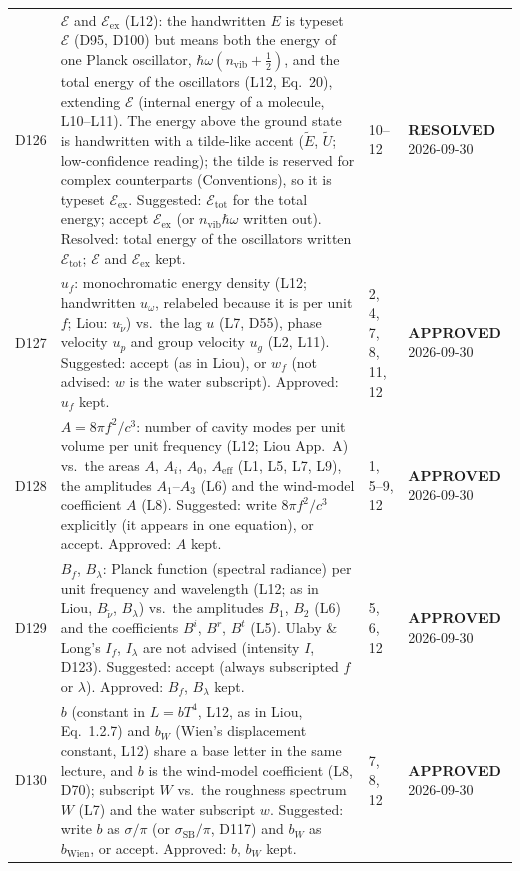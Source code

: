 \documentclass[11pt, oneside]{article}
\newcommand{\approved}{\textbf{APPROVED}}
\newcommand{\resolved}{\textbf{RESOLVED}}
\begin{document}
\begin{longtable}{l >{\raggedright\arraybackslash}p{} l l}
D126 & $\mathcal{E}$ and $\mathcal{E}_\mathrm{ex}$ (L12): the handwritten $E$ is typeset $\mathcal{E}$ (D95, D100) but means both the energy of one Planck oscillator, $\hbar\omega(n_\mathrm{vib} + \frac12)$, and the total energy of the oscillators (L12, Eq.~20), extending $\mathcal{E}$ (internal energy of a molecule, L10--L11). The energy above the ground state is handwritten with a tilde-like accent ($\tilde{E}$, $\tilde{U}$; low-confidence reading); the tilde is reserved for complex counterparts (Conventions), so it is typeset $\mathcal{E}_\mathrm{ex}$. Suggested: $\mathcal{E}_\mathrm{tot}$ for the total energy; accept $\mathcal{E}_\mathrm{ex}$ (or $n_\mathrm{vib}\hbar\omega$ written out). Resolved: total energy of the oscillators written $\mathcal{E}_\mathrm{tot}$; $\mathcal{E}$ and $\mathcal{E}_\mathrm{ex}$ kept. & 10--12 & \resolved{} 2026-09-30 \\
D127 & $u_f$: monochromatic energy density (L12; handwritten $u_\omega$, relabeled because it is per unit $f$; Liou: $u_{\tilde{\nu}}$) vs.\ the lag $u$ (L7, D55), phase velocity $u_p$ and group velocity $u_g$ (L2, L11). Suggested: accept (as in Liou), or $w_f$ (not advised: $w$ is the water subscript). Approved: $u_f$ kept. & 2, 4, 7, 8, 11, 12 & \approved{} 2026-09-30 \\
D128 & $A = 8\pi f^2/c^3$: number of cavity modes per unit volume per unit frequency (L12; Liou App.~A) vs.\ the areas $A$, $A_i$, $A_0$, $A_\mathrm{eff}$ (L1, L5, L7, L9), the amplitudes $A_1$--$A_3$ (L6) and the wind-model coefficient $A$ (L8). Suggested: write $8\pi f^2/c^3$ explicitly (it appears in one equation), or accept. Approved: $A$ kept. & 1, 5--9, 12 & \approved{} 2026-09-30 \\
D129 & $B_f$, $B_\lambda$: Planck function (spectral radiance) per unit frequency and wavelength (L12; as in Liou, $B_{\tilde{\nu}}$, $B_\lambda$) vs.\ the amplitudes $B_1$, $B_2$ (L6) and the coefficients $B^i$, $B^r$, $B^t$ (L5). Ulaby \& Long's $I_f$, $I_\lambda$ are not advised (intensity $I$, D123). Suggested: accept (always subscripted $f$ or $\lambda$). Approved: $B_f$, $B_\lambda$ kept. & 5, 6, 12 & \approved{} 2026-09-30 \\
D130 & $b$ (constant in $L = bT^4$, L12, as in Liou, Eq.~1.2.7) and $b_W$ (Wien's displacement constant, L12) share a base letter in the same lecture, and $b$ is the wind-model coefficient (L8, D70); subscript $W$ vs.\ the roughness spectrum $W$ (L7) and the water subscript $w$. Suggested: write $b$ as $\sigma/\pi$ (or $\sigma_\mathrm{SB}/\pi$, D117) and $b_W$ as $b_\mathrm{Wien}$, or accept. Approved: $b$, $b_W$ kept. & 7, 8, 12 & \approved{} 2026-09-30 \\

\end{longtable}
\end{document}
